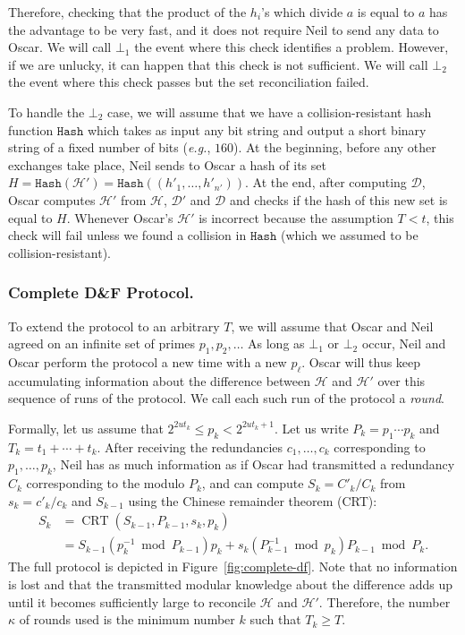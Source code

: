 \documentclass[twoside,envcountsame,runningheads]{llncs}
\newcommand{\Set}{\mathcal{H}}
\newcommand{\SetD}{\mathcal{D}}
\newcommand{\df}{D\&F\xspace}
\newcommand{\eg}{\textit{e.g.}\xspace}
\newcommand{\Hash}{\ensuremath{\mathtt{Hash}}}
\DeclareMathOperator{\CRT}{CRT}
\begin{document}
Therefore, checking that the product of the $h_i$'s which divide $a$ is equal to $a$ has the advantage to be very fast, and it does not require Neil to send any data to Oscar. We will call $\bot_1$ the event where this check identifies a problem. 
However, if we are unlucky, it can happen that this check is not sufficient. We will call $\bot_2$ the event where this check passes but the set reconciliation failed.

To handle the $\bot_2$ case, we will assume that we have a collision-resistant hash function $\Hash$ which takes as input any bit string and output a short binary string of a fixed number of bits (\eg, $160$).
At the beginning, before any other exchanges take place, Neil sends to Oscar a hash of its set $H = \Hash(\Set') = \Hash((h'_1,\dots,h'_{n'}))$. At the end, after computing $\SetD$, Oscar computes $\Set'$ from $\Set$, $\SetD'$ and $\SetD$ and checks if the hash of this new set is equal to $H$.
Whenever Oscar's $\Set'$ is incorrect because the assumption $T < t$, this check will fail unless we found a collision in $\Hash$ (which we assumed to be collision-resistant).

\subsubsection{Complete \df Protocol.}
\label{sec:complete-df}

To extend the protocol to an arbitrary $T$, we will assume that Oscar and Neil agreed on an infinite set of primes $p_1,p_2,\ldots$ As long as $\bot_1$ or $\bot_2$ occur, Neil and Oscar perform the protocol a new time with a new $p_\ell$. Oscar will thus keep accumulating information about the difference between $\Set$ and $\Set'$ over this sequence of runs of the protocol. We call each such run of the protocol a \emph{round}.

Formally, let us assume that $2^{2 u t_k} \le p_k < 2^{2 u t_k +1}$.
Let us write $P_k = p_1 \cdots p_k$ and $T_k = t_1 + \cdots + t_k$.
After receiving the redundancies $c_1,\dots,c_k$ corresponding to $p_1,\dots,p_k$, Neil has as much information as if Oscar had transmitted a redundancy $C_k$ corresponding to the modulo $P_k$, and can compute $S_k = C'_k / C_k$ from $s_k = c'_k/c_k$ and $S_{k-1}$ using the Chinese remainder theorem (CRT): 
\begin{align*}
 S_k &= \CRT(S_{k-1},P_{k-1},s_k,p_k) \\
     &= S_{k-1} (p_k^{-1} \bmod P_{k-1}) p_k + s_k (P_{k-1}^{-1} \bmod p_k) P_{k-1} \bmod P_k.
\end{align*}
The full protocol is depicted in Figure~\ref{fig:complete-df}.
Note that no information is lost and that the transmitted modular knowledge about the difference adds up until it becomes sufficiently large to reconcile $\Set$ and $\Set'$.
Therefore, the number $\kappa$ of rounds used is the minimum number $k$ such that $T_k \ge T$.
\end{document}
